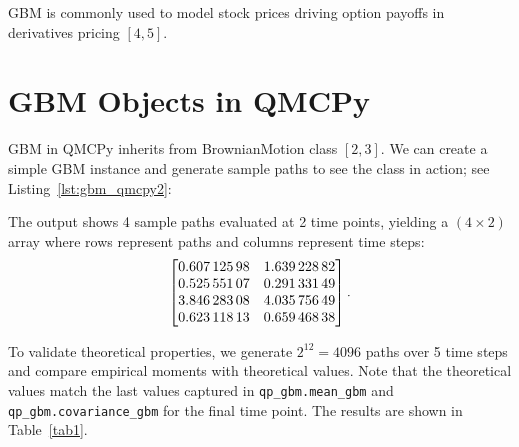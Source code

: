 \documentclass{article}
\begin{document}
GBM is commonly used to model stock prices driving option payoffs in derivatives pricing $[4, 5]$. 

\section{GBM Objects in QMCPy}

GBM in QMCPy inherits from BrownianMotion class $[2, 3]$. 
We can create a simple GBM instance and generate sample paths to see the class in action; see Listing~\ref{lst:gbm_qmcpy2}:



The output shows 4 sample paths evaluated at 2 time points, yielding a $(4 \times 2)$ array where rows represent paths and columns represent time steps:
\[
\left[
\begin{array}{@{} S[table-format=1.3] S[table-format=1.3] @{}}
\num{0.60712598} & \num{1.63922882} \\
\num{0.52555107} & \num{0.29133149} \\
\num{3.84628308} & \num{4.03575649} \\
\num{0.62311813} & \num{0.65946838}
\end{array}
\right].
\]

To validate theoretical properties, we generate $2^{12} = 4096$ paths over 5 time steps and compare empirical moments with theoretical values.  Note that the theoretical values match the last values captured in \texttt{qp\_gbm.mean\_gbm} and \texttt{qp\_gbm.covariance\_gbm} for the final time point. The results are shown in Table~\ref{tab1}.

 
\end{document}
